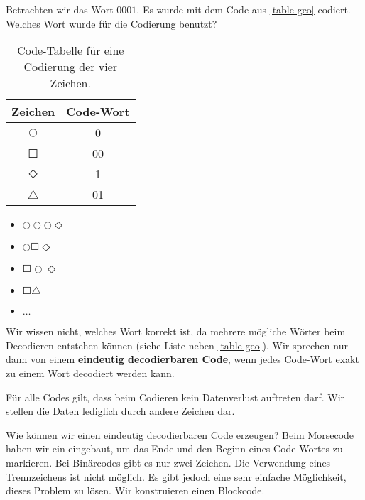 Betrachten wir das Wort $0001$. Es wurde mit dem Code aus \autoref{table-geo} codiert. Welches Wort wurde für die Codierung benutzt? 

\begin{table}[htb]
\centering
\begin{minipage}{0.65\textwidth}
\centering
\begin{tabular}{|c|c|}
\hline
Zeichen & Code-Wort \\ \hline
 $\Circle$       & 0         \\ \hline
 $\Square$       & 00        \\ \hline
 $\Diamond$       & 1         \\ \hline
 $\triangle$       & 01        \\ \hline
\end{tabular}
\caption{Code-Tabelle für eine Codierung der vier Zeichen.}
\label{table-geo}
\end{minipage}
\hfill
\begin{minipage}{0.25\textwidth}
\centering
\begin{itemize}
\item $\Circle\Circle\Circle\Diamond$
\item $\Circle\Square\Diamond$
\item $\Square\Circle\Diamond$
\item $\Square\triangle$
\item $\dots$
\end{itemize}
\end{minipage}
\end{table}

Wir wissen nicht, welches Wort korrekt ist, da mehrere mögliche Wörter beim Decodieren entstehen können (siehe Liste neben \autoref{table-geo}). Wir sprechen nur dann von einem \textbf{eindeutig decodierbaren Code}, wenn jedes Code-Wort exakt zu einem Wort decodiert werden kann.

\begin{important}
Für alle Codes gilt, dass beim Codieren kein Datenverlust auftreten darf. Wir stellen die Daten lediglich durch andere Zeichen dar.
\end{important}

Wie können wir einen eindeutig decodierbaren Code erzeugen? Beim Morsecode haben wir ein  eingebaut, um das Ende und den Beginn eines Code-Wortes zu markieren. Bei Binärcodes gibt es nur zwei Zeichen. Die Verwendung eines Trennzeichens ist nicht möglich. Es gibt jedoch eine sehr einfache Möglichkeit, dieses Problem zu lösen. Wir konstruieren einen Blockcode.

